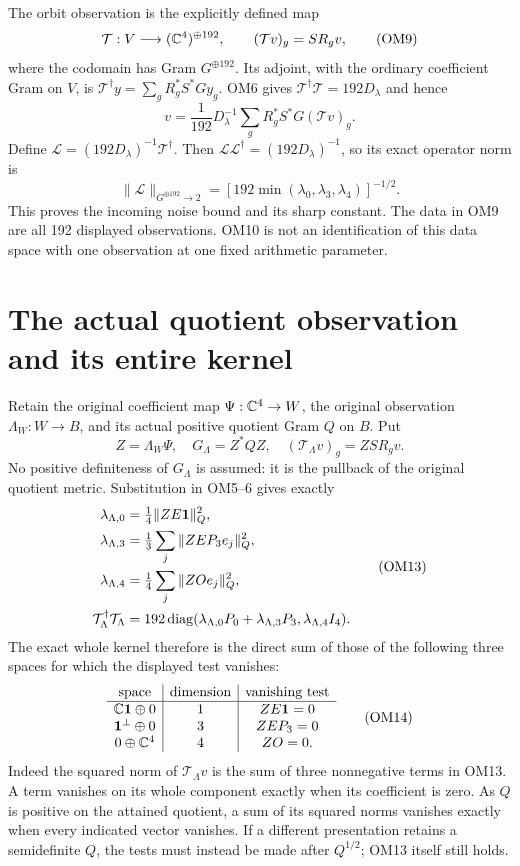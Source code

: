 The orbit observation is the explicitly defined map
\[
\mathcal T:V\longrightarrow(\mathbb C^4)^{\oplus192},\qquad
(\mathcal Tv)_g=S R_gv,
\tag{OM9}
\]
where the codomain has Gram $G^{\oplus192}$.  Its adjoint, with the
ordinary coefficient Gram on $V$, is
$\mathcal T^\dagger y=\sum_g R_g^*S^*G y_g$.
OM6 gives $\mathcal T^\dagger\mathcal T=192D_\lambda$ and hence
\[
v=\frac1{192}D_\lambda^{-1}\sum_gR_g^*S^*G(\mathcal Tv)_g.
\tag{OM10}
\]
Define $\mathcal L=(192D_\lambda)^{-1}\mathcal T^\dagger$.
Then
$\mathcal L\mathcal L^\dagger=(192D_\lambda)^{-1}$, so its exact
operator norm is
\[
\|\mathcal L\|_{G^{\oplus192}\to2}
=[192\min(\lambda_0,\lambda_3,\lambda_4)]^{-1/2}.
\tag{OM11}
\]
This proves the incoming noise bound and its sharp constant.
The data in OM9 are all 192 displayed observations.  OM10 is not
an identification of this data space with one observation at one
fixed arithmetic parameter.

\section{The actual quotient observation and its entire kernel}
Retain the original coefficient map $\Psi:\mathbb C^4\to W$, the original
observation $\Lambda_W:W\to B$, and its actual positive quotient
Gram $Q$ on $B$.  Put
\[
Z=\Lambda_W\Psi,\quad G_\Lambda=Z^*QZ,\quad
(\mathcal T_\Lambda v)_g=ZS R_gv.
\tag{OM12}
\]
No positive definiteness of $G_\Lambda$ is assumed: it is the
pullback of the original quotient metric.  Substitution in OM5--6
gives exactly
\[
\begin{split}
\lambda_{\Lambda,0}&=\tfrac14\|ZE\mathbf 1\|_Q^2,\\
\lambda_{\Lambda,3}&=\tfrac13\sum_j\|ZE P_3e_j\|_Q^2,\\
\lambda_{\Lambda,4}&=\tfrac14\sum_j\|ZO e_j\|_Q^2,\\
\mathcal T_\Lambda^\dagger\mathcal T_\Lambda
&=192\operatorname{diag}(\lambda_{\Lambda,0}P_0+
\lambda_{\Lambda,3}P_3,\lambda_{\Lambda,4}I_4).
\end{split}\tag{OM13}
\]
The exact whole kernel therefore is the direct sum of those of the
following three spaces for which the displayed test vanishes:
\[
\begin{array}{c|c|c}
\text{space}&\text{dimension}&\text{vanishing test}\\ \hline
\mathbb C\mathbf 1\oplus0&1&ZE\mathbf 1=0\\
\mathbf 1^\perp\oplus0&3&ZE P_3=0\\
0\oplus\mathbb C^4&4&ZO=0 .
\end{array}\tag{OM14}
\]
Indeed the squared norm of $\mathcal T_\Lambda v$ is the sum of
three nonnegative terms in OM13.  A term vanishes on its whole
component exactly when its coefficient is zero.  As $Q$ is
positive on the attained quotient, a sum of its squared norms
vanishes exactly when every indicated vector vanishes.
If a different presentation retains a semidefinite $Q$, the tests
must instead be made after $Q^{1/2}$; OM13 itself still holds.

